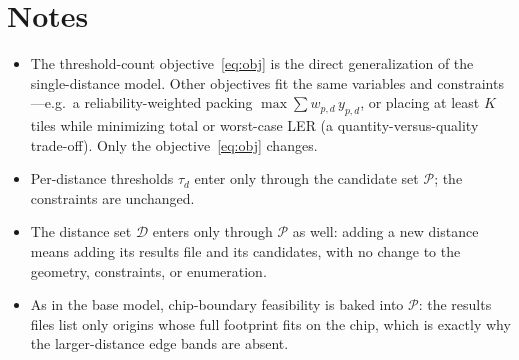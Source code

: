 \documentclass[11pt]{article}
\newcommand{\Pset}{\mathcal{P}}
\newcommand{\Dset}{\mathcal{D}}
\begin{document}
\section{Notes}
\begin{itemize}[itemsep=2pt]
  \item The threshold-count objective~\eqref{eq:obj} is the direct generalization
        of the single-distance model. Other objectives fit the same variables and
        constraints---e.g.\ a reliability-weighted packing
        $\max \sum w_{p,d}\, y_{p,d}$, or placing at least $K$ tiles while
        minimizing total or worst-case LER (a quantity-versus-quality
        trade-off). Only the objective~\eqref{eq:obj} changes.
  \item Per-distance thresholds $\tau_d$ enter only through the candidate set
        $\Pset$; the constraints are unchanged.
  \item The distance set $\Dset$ enters only through $\Pset$ as well: adding a new
        distance means adding its results file and its candidates, with no change to
        the geometry, constraints, or enumeration.
  \item As in the base model, chip-boundary feasibility is baked into $\Pset$: the
        results files list only origins whose full footprint fits on the chip,
        which is exactly why the larger-distance edge bands are absent.
\end{itemize}
\end{document}
